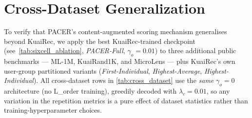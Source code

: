 \section{Cross-Dataset Generalization}
\label{sec:cross_dataset}

To verify that PACER's content-augmented scoring mechanism generalises
beyond KuaiRec, we apply the best KuaiRec-trained checkpoint
(see~\cref{tab:sixcell_ablation}, \emph{PACER-Full}, $\gamma_o=0.01$) to
three additional public benchmarks --- ML-1M, KuaiRand1K, and MicroLens ---
plus KuaiRec's own user-group partitioned variants
(\emph{First-Individual}, \emph{Highest-Average}, \emph{Highest-Individual}).
All cross-dataset rows in \cref{tab:cross_dataset} use the \emph{same}
$\gamma_o=0$ architecture (no L\_order training), greedily decoded with
$\lambda_c=0.01$, so any variation in the repetition metrics is a pure
effect of dataset statistics rather than training-hyperparameter choices.

